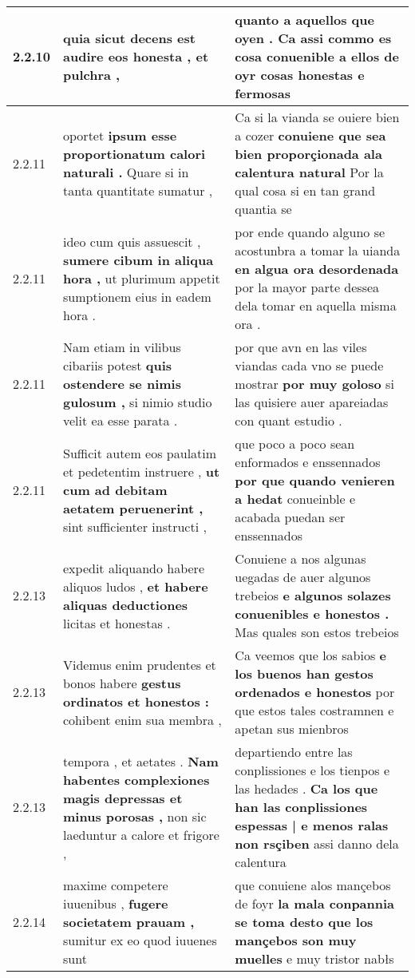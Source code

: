 \begin{tabular}{|p{1cm}|p{6.5cm}|p{6.5cm}|}
2.2.10 & quia sicut decens est \textbf{ audire eos honesta , } et pulchra , & quanto a aquellos que oyen . \textbf{ Ca assi commo es cosa conuenible a ellos de oyr } cosas honestas e fermosas \\\hline
2.2.11 & oportet \textbf{ ipsum esse proportionatum calori naturali . } Quare si in tanta quantitate sumatur , & Ca si la vianda se ouiere bien a cozer \textbf{ conuiene que sea bien proporçionada ala calentura natural } Por la qual cosa si en tan grand quantia se \\\hline
2.2.11 & ideo cum quis assuescit , \textbf{ sumere cibum in aliqua hora , } ut plurimum appetit sumptionem eius in eadem hora . & por ende quando alguno se acostunbra a tomar la uianda \textbf{ en algua ora desordenada } por la mayor parte dessea dela tomar en aquella misma ora . \\\hline
2.2.11 & Nam etiam in vilibus cibariis potest \textbf{ quis ostendere se nimis gulosum , } si nimio studio velit ea esse parata . & por que avn en las viles viandas cada vno se puede mostrar \textbf{ por muy goloso } si las quisiere auer apareiadas con quant estudio . \\\hline
2.2.11 & Sufficit autem eos paulatim et pedetentim instruere , \textbf{ ut cum ad debitam aetatem peruenerint , } sint sufficienter instructi , & que poco a poco sean enformados e enssennados \textbf{ por que quando venieren a hedat } conueinble e acabada puedan ser enssennados \\\hline
2.2.13 & expedit aliquando habere aliquos ludos , \textbf{ et habere aliquas deductiones } licitas et honestas . & Conuiene a nos algunas uegadas de auer algunos trebeios \textbf{ e algunos solazes conuenibles e honestos . } Mas quales son estos trebeios \\\hline
2.2.13 & Videmus enim prudentes et bonos habere \textbf{ gestus ordinatos et honestos : } cohibent enim sua membra , & Ca veemos que los sabios \textbf{ e los buenos han gestos ordenados e honestos } por que estos tales costramnen e apetan sus mienbros \\\hline
2.2.13 & tempora , et aetates . \textbf{ Nam habentes complexiones magis depressas et minus porosas , } non sic laeduntur a calore et frigore , & departiendo entre las conplissiones e los tienpos e las hedades . \textbf{ Ca los que han las conplissiones espessas | e menos ralas non rsçiben } assi danno dela calentura \\\hline
2.2.14 & maxime competere iuuenibus , \textbf{ fugere societatem prauam , } sumitur ex eo quod iuuenes sunt & que conuiene alos mançebos de foyr \textbf{ la mala conpannia se toma desto que los mançebos son muy muelles } e muy tristor nabłs \\\hline

\end{tabular}
